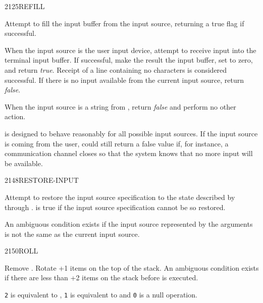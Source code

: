 \begin{worddef}{2125}{REFILL}
\item {}

	Attempt to fill the input buffer from the input source,
	returning a true flag if successful.

	When the input source is the user input device, attempt to
	receive input into the terminal input buffer. If successful,
	make the result the input buffer, set  to zero, and
	return \emph{true}. Receipt of a line containing no characters
	is considered successful. If there is no input available from
	the current input source, return \emph{false}.

	When the input source is a string from , return
	\emph{false} and perform no other action.


	\begin{rationale} %
		 is designed to behave reasonably for all possible
		input sources. If the input source is coming from the user,
		 could still return a false value if, for instance,
		a communication channel closes so that the system knows that no
		more input will be available.
	\end{rationale}
\end{worddef}


\begin{worddef}{2148}{RESTORE-INPUT}
\item {}

	Attempt to restore the input source specification to the state
	described by  through .  is
	true if the input source specification cannot be so restored.

	An ambiguous condition exists if the input source represented
	by the arguments is not the same as the current input source.

\end{worddef}

\vspace{2ex}\enlargethispage{-8ex}
\begin{worddef}{2150}{ROLL}
\item {}

	Remove . Rotate +1 items on the top of the stack.
	An ambiguous condition exists if there are less than +2
	items on the stack before  is executed.

	\begin{rationale} %
		\texttt{2}  is equivalent to ,
		\texttt{1}  is equivalent to  and
		\texttt{0}  is a null operation.
	\end{rationale}
\end{worddef}

